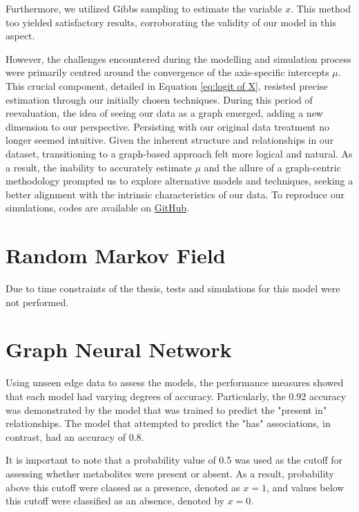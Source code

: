 \documentclass[
11pt, %
oneside, %
english, %
singlespacing, %
headsepline, %
chapterinoneline, %
]{MastersDoctoralThesis} %
\begin{document}
Furthermore, we utilized Gibbs sampling to estimate the variable $x$. This method too yielded satisfactory results, corroborating the validity of our model in this aspect.

However, the challenges encountered during the modelling and simulation process were primarily centred around the convergence of the axis-specific intercepts $\mu$. This crucial component, detailed in Equation \ref{eq:logit of X}, resisted precise estimation through our initially chosen techniques. During this period of reevaluation, the idea of seeing our data as a graph emerged, adding a new dimension to our perspective. Persisting with our original data treatment no longer seemed intuitive. Given the inherent structure and relationships in our dataset, transitioning to a graph-based approach felt more logical and natural. As a result, the inability to accurately estimate $\mu$ and the allure of a graph-centric methodology prompted us to explore alternative models and techniques, seeking a better alignment with the intrinsic characteristics of our data. To reproduce our simulations, codes are available on \href{https://github.com/commons-research/anticipated-lotus}{GitHub}.

\section{Random Markov Field}
Due to time constraints of the thesis, tests and simulations for this model were not performed.

\section{Graph Neural Network}
Using unseen edge data to assess the models, the performance measures showed that each model had varying degrees of accuracy. Particularly, the 0.92 accuracy was demonstrated by the model that was trained to predict the "present in" relationships. The model that attempted to predict the "has" associations, in contrast, had an accuracy of 0.8.

It is important to note that a probability value of 0.5 was used as the cutoff for assessing whether metabolites were present or absent. As a result, probability above this cutoff were classed as a presence, denoted as $x=1$, and values below this cutoff were classified as an absence, denoted by $x=0$.
\end{document}
